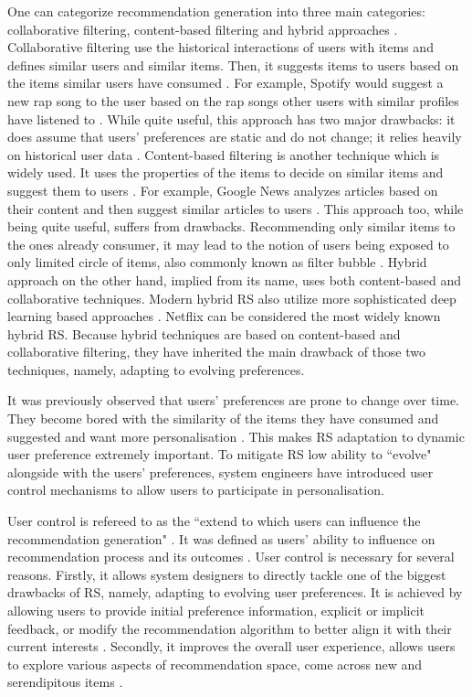\documentclass[a4paper,12pt]{article}
\begin{document}
One can categorize recommendation generation into three main categories: collaborative filtering, content-based filtering and hybrid approaches \citep{burke2002hybrid}. Collaborative filtering use the historical interactions of users with items and defines similar users and similar items. Then, it suggests items to users based on the items similar users have consumed \citep{schafer1999recommender}. For example, Spotify would suggest a new rap song to the user based on the rap songs other users with similar profiles have listened to \citep{jacobson2016music}. While quite useful, this approach has two major drawbacks: it does assume that users' preferences are static and do not change; it relies heavily on historical user data \citep{wang2011collaborative}. Content-based filtering is another technique which is widely used. It uses the properties of the items to decide on similar items and suggest them to users \citep{pazzani2007content}. For example, Google News analyzes articles based on their content and then suggest similar articles to users \citep{das2007google}. This approach too, while being quite useful, suffers from drawbacks. Recommending only similar items to the ones already consumer, it may lead to the notion of users being exposed to only limited circle of items, also commonly known as filter bubble \citep{tintarevKnowingUnknownVisualising2018}. Hybrid approach on the other hand, implied from its name, uses both content-based and collaborative techniques. Modern hybrid RS also utilize more sophisticated deep learning based approaches \citep{bahrainian2020deep}. Netflix can be considered the most widely known hybrid RS. Because hybrid techniques are based on content-based and collaborative filtering, they have inherited the main drawback of those two techniques, namely, adapting to evolving preferences. 

It was previously observed that users' preferences are prone to change over time. They become bored with the similarity of the items they have consumed and suggested and want more personalisation \citep{songWhenHowDiversify2019}. This makes RS adaptation to dynamic user preference extremely important. To mitigate RS low ability to ``evolve" alongside with the users' preferences, system engineers have introduced user control mechanisms to allow users to participate in personalisation. 

User control is refereed to as the ``extend to which users can influence the recommendation generation" \citep{jannach2019explanations}. It was defined as users' ability to influence on recommendation process and its outcomes \citep{knijnenburgExplainingUserExperience2012}. User control is necessary for several reasons. Firstly, it allows system designers to directly tackle one of the biggest drawbacks of RS, namely, adapting to evolving user preferences. It is achieved by allowing users to provide initial preference information, explicit or implicit feedback, or modify the recommendation algorithm to better align it with their current interests \citep{tintarev2015explaining}. Secondly, it improves the overall user experience, allows users to explore various aspects of recommendation space, come across new and serendipitous items \citep{tintarev2015explaining,kotkovSurveySerendipityRecommender2016}. 
\end{document}
